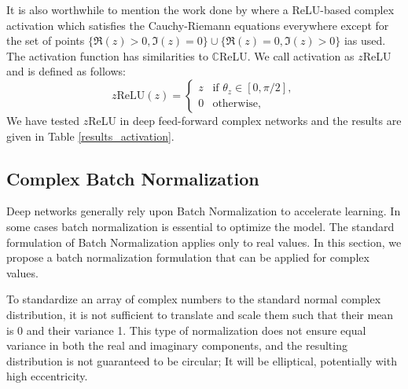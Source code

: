 \documentclass{article}
\begin{document}
It is also worthwhile to mention the work done by \cite{guberman2016complex} where a ReLU-based complex activation which satisfies the Cauchy-Riemann equations everywhere except for the set of points $\{\Re(z) > 0, \Im(z)=0\} \cup \{\Re(z)=0, \Im(z)>0\}$ ias used. The activation function has similarities to $\mathbb{C}$ReLU. We call \cite{guberman2016complex} activation as $z$ReLU and is defined as follows:
\begin{equation}\label{zrelu}
z\textrm{ReLU}(z) = \begin{cases}
z & \textrm{if } \theta_{z} \in [0, \pi / 2], \\
0 & \textrm{otherwise,}
\end{cases}
\end{equation}
We have tested $z$ReLU in deep feed-forward complex networks and the results are given in Table \ref{results_activation}.

\subsection{Complex Batch Normalization}\label{cbn}
Deep networks generally rely upon Batch Normalization \citep{ioffe2015batch} to accelerate learning. In some cases batch normalization is essential to optimize the model. The standard formulation of Batch Normalization applies only to real values. In this section, we propose a batch normalization formulation that can be applied for complex values.

To standardize an array of complex numbers to the standard normal complex distribution, it is not sufficient to translate and scale them such that their mean is 0 and their variance 1. This type of normalization does not ensure equal variance in both the real and imaginary components, and the resulting distribution is not guaranteed to be circular; It will be elliptical, potentially with high eccentricity.
\end{document}
